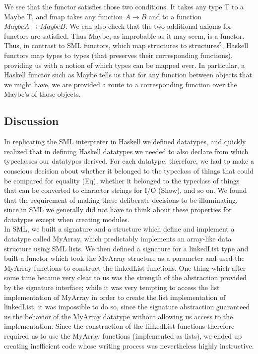 \documentclass[journal]{IEEEtran}
\begin{document}
We see that the functor satisfies those two conditions. It takes any type T to a Maybe T, and fmap takes any function $A \rightarrow B$ and to a function $MaybeA \rightarrow Maybe B$. We can also check that the two additional axioms for functors are satisfied. Thus Maybe, as improbable as it may seem, is a functor.\\

Thus, in contrast to SML functors, which map structures to structures$^{5}$, Haskell functors map types to types (that preserves their corresponding functions), providing us with a notion of which types can be mapped over. In particular, a Haskell functor such as Maybe tells us that for any function between objects that we might have, we are provided a route to a corresponding function over the Maybe's of those objects.\\

\subsection*{Discussion}
In replicating the SML interpreter in Haskell we defined datatypes, and quickly realized that in defining Haskell datatypes we needed to also declare from which typeclasses our datatypes derived. For each datatype, therefore, we had to make a conscious decision about whether it belonged to the typeclass of things that could be compared for equality (Eq), whether it belonged to the typeclass of things that can be converted to character strings for I/O (Show), and so on. We found that the requirement of making these deliberate decisions to be illuminating, since in SML we generally did not have to think about these properties for datatypes except when creating modules.\\

In SML, we built a signature and a structure which define and implement a datatype called MyArray, which predictably implements an array-like data structure using SML lists. We then defined a signature for a linkedList type and built a functor which took the MyArray structure as a parameter and used the MyArray functions to construct the linkedList functions. One thing which after some time became very clear to us was the strength of the abstraction provided by the signature interface; while it was very tempting to access the list implementation of MyArray in order to create the list implementation of linkedList, it was impossible to do so, since the signature abstraction guaranteed us the behavior of the MyArray datatype without allowing us access to the implementation. Since the construction of the linkedList functions therefore required us to use the MyArray functions (implemented as lists), we ended up creating inefficient code whose writing process was nevertheless highly instructive.
\end{document}
